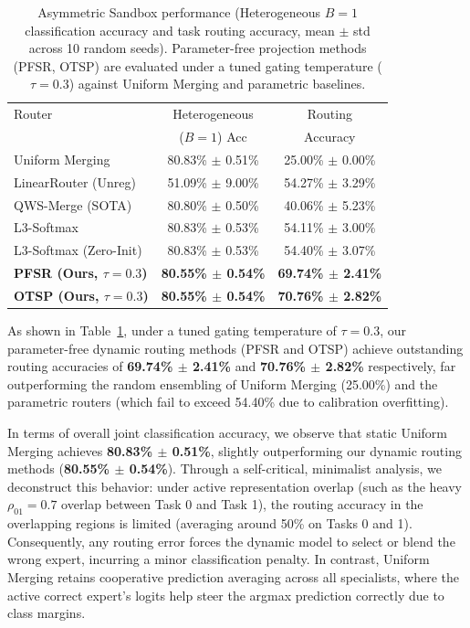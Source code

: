 \begin{table}[htbp]
\caption{Asymmetric Sandbox performance (Heterogeneous $B=1$ classification accuracy and task routing accuracy, mean $\pm$ std across 10 random seeds). Parameter-free projection methods (PFSR, OTSP) are evaluated under a tuned gating temperature ($\tau = 0.3$) against Uniform Merging and parametric baselines.}
\label{tab:asymmetric_results}
\vskip 0.15in
\begin{center}
\begin{footnotesize}
\begin{sc}
\setlength{\tabcolsep}{2.0pt}
\begin{tabular}{lcc}
\toprule
Router & Heterogeneous & Routing \\
& ($B=1$) Acc & Accuracy \\
\midrule
Uniform Merging & 80.83\% $\pm$ 0.51\% & 25.00\% $\pm$ 0.00\% \\
LinearRouter (Unreg) & 51.09\% $\pm$ 9.00\% & 54.27\% $\pm$ 3.29\% \\
QWS-Merge (SOTA) & 80.80\% $\pm$ 0.50\% & 40.06\% $\pm$ 5.23\% \\
L3-Softmax & 80.83\% $\pm$ 0.53\% & 54.11\% $\pm$ 3.00\% \\
L3-Softmax (Zero-Init) & 80.83\% $\pm$ 0.53\% & 54.40\% $\pm$ 3.07\% \\
\midrule
\textbf{PFSR (Ours, $\tau=0.3$)} & \textbf{80.55\% $\pm$ 0.54\%} & \textbf{69.74\% $\pm$ 2.41\%} \\
\textbf{OTSP (Ours, $\tau=0.3$)} & \textbf{80.55\% $\pm$ 0.54\%} & \textbf{70.76\% $\pm$ 2.82\%} \\
\bottomrule
\end{tabular}
\end{sc}
\end{footnotesize}
\end{center}
\vskip -0.1in
\end{table}

As shown in Table~\ref{tab:asymmetric_results}, under a tuned gating temperature of $\tau = 0.3$, our parameter-free dynamic routing methods (PFSR and OTSP) achieve outstanding routing accuracies of \textbf{69.74\% $\pm$ 2.41\%} and \textbf{70.76\% $\pm$ 2.82\%} respectively, far outperforming the random ensembling of Uniform Merging (25.00\%) and the parametric routers (which fail to exceed 54.40\% due to calibration overfitting). 

In terms of overall joint classification accuracy, we observe that static Uniform Merging achieves \textbf{80.83\% $\pm$ 0.51\%}, slightly outperforming our dynamic routing methods (\textbf{80.55\% $\pm$ 0.54\%}). Through a self-critical, minimalist analysis, we deconstruct this behavior: under active representation overlap (such as the heavy $\rho_{01} = 0.7$ overlap between Task 0 and Task 1), the routing accuracy in the overlapping regions is limited (averaging around 50\% on Tasks 0 and 1). Consequently, any routing error forces the dynamic model to select or blend the wrong expert, incurring a minor classification penalty. In contrast, Uniform Merging retains cooperative prediction averaging across all specialists, where the active correct expert's logits help steer the argmax prediction correctly due to class margins.

